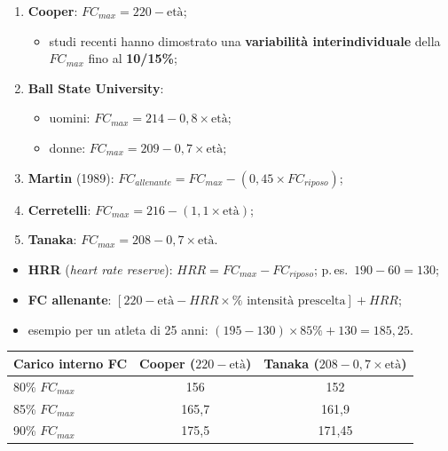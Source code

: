 \begin{enumerate}
  \item \textbf{Cooper}: $FC_{max} = 220 - \textrm{et\`a}$;
    \begin{itemize}
      \item studi recenti hanno dimostrato una \textbf{variabilità interindividuale} della
        $FC_{max}$ fino al \textbf{10/15\%};
    \end{itemize}
  \item \textbf{Ball State University}:
    \begin{itemize}
      \item uomini: $FC_{max} = 214 - 0{,}8 \times \textrm{et\`a}$;
      \item donne: $FC_{max} = 209 - 0{,}7 \times \textrm{et\`a}$;
    \end{itemize}
  \item \textbf{Martin} (1989): $FC_{allenante} = FC_{max} - (0{,}45 \times FC_{riposo})$;
  \item \textbf{Cerretelli}: $FC_{max} = 216 - (1{,}1 \times \textrm{et\`a})$;
  \item \textbf{Tanaka}: $FC_{max} = 208 - 0{,}7 \times \textrm{et\`a}$.
\end{enumerate}

\begin{itemize}
  \item \textbf{HRR} (\textit{heart rate reserve}): $HRR = FC_{max} - FC_{riposo}$; p.\,es.\
    $190 - 60 = 130$;
  \item \textbf{FC allenante}: $[220 - \textrm{et\`a} - HRR \times \% \textrm{ intensit\`a
    prescelta}] + HRR$;
  \item esempio per un atleta di 25 anni: $(195 - 130) \times 85\% + 130 = 185{,}25$.
\end{itemize}

\begin{table}[htbp]
  \centering
  \small
  \renewcommand{\arraystretch}{1.3}
  \begin{tabularx}{\textwidth}{|X|c|c|}
    \hline
    \textbf{Carico interno FC} & \textbf{Cooper} ($220 - \textrm{et\`a}$) &
      \textbf{Tanaka} ($208 - 0{,}7 \times \textrm{et\`a}$) \\
    \hline
    80\% $FC_{max}$ & 156 & 152 \\
    \hline
    85\% $FC_{max}$ & 165,7 & 161,9 \\
    \hline
    90\% $FC_{max}$ & 175,5 & 171,45 \\
    \hline
  \end{tabularx}
\end{table}

